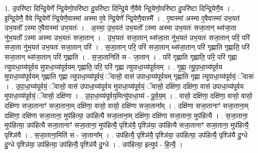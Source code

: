 \documentclass[17pt]{extarticle}
\begin{document}
1. उ॒परि॑ष्टा दिन्द्रि॒येणे᳚ न्द्रि॒येणो॒परि॑ष्टा दु॒परि॑ष्टा दिन्द्रि॒ये णै॒वैवे न्द्रि॒येणो॒परि॑ष्टा दु॒परि॑ष्टा दिन्द्रि॒येणै॒व । . इ॒न्द्रि॒येणै॒ वैवे न्द्रि॒येणे᳚ न्द्रि॒येणै॒वास्मा॑ अस्मा ए॒वे न्द्रि॒येणे᳚ न्द्रि॒येणै॒वास्मै᳚ । . ए॒वास्मा॑ अस्मा ए॒वैवास्मा॑ उभ॒यत॑ उभ॒यतो᳚ ऽस्मा ए॒वैवास्मा॑ उभ॒यतः॑ । . अ॒स्मा॒ उ॒भ॒यत॑ उभ॒यतो᳚ ऽस्मा अस्मा उभ॒यतः॑ सजा॒तान् थ्स॑जा॒ता नु॑भ॒यतो᳚ ऽस्मा अस्मा उभ॒यतः॑ सजा॒तान् । . उ॒भ॒यतः॑ सजा॒तान् थ्स॑जा॒ता नु॑भ॒यत॑ उभ॒यतः॑ सजा॒तान् परि॒ परि॑ सजा॒ता नु॑भ॒यत॑ उभ॒यतः॑ सजा॒तान् परि॑ । . स॒जा॒तान् परि॒ परि॑ सजा॒तान् थ्स॑जा॒तान् परि॑ गृह्णाति गृह्णाति॒ परि॑ सजा॒तान् थ्स॑जा॒तान् परि॑ गृह्णाति । . स॒जा॒तानिति॑ स - जा॒तान् । . परि॑ गृह्णाति गृह्णाति॒ परि॒ परि॑ गृह्णा त्युपाधा॒य्य॑पूर्वय मुपाधा॒य्य॑पूर्वयम् गृह्णाति॒ परि॒ परि॑ गृह्णा त्युपाधा॒य्य॑पूर्वयम् । . गृ॒ह्णा॒ त्यु॒पा॒धा॒य्य॑पूर्वय मुपाधा॒य्य॑पूर्वयम् गृह्णाति गृह्णा त्युपाधा॒य्य॑पूर्वयं॒ ॅवासो॒ वास॑ उपाधा॒य्य॑पूर्वयम् गृह्णाति गृह्णा त्युपाधा॒य्य॑पूर्वयं॒ ॅवासः॑ । . उ॒पा॒धा॒य्य॑पूर्वयं॒ ॅवासो॒ वास॑ उपाधा॒य्य॑पूर्वय मुपाधा॒य्य॑पूर्वयं॒ ॅवासो॒ दक्षि॑णा॒ दक्षि॑णा॒ वास॑ उपाधा॒य्य॑पूर्वय मुपाधा॒य्य॑पूर्वयं॒ ॅवासो॒ दक्षि॑णा । . उ॒पा॒धा॒य्य॑पूर्वय॒मित्यु॑पाधा॒य्य॑ - पू॒र्व॒य॒म् । . वासो॒ दक्षि॑णा॒ दक्षि॑णा॒ वासो॒ वासो॒ दक्षि॑णा सजा॒तानाꣳ॑ सजा॒ताना॒म् दक्षि॑णा॒ वासो॒ वासो॒ दक्षि॑णा सजा॒ताना᳚म् । . दक्षि॑णा सजा॒तानाꣳ॑ सजा॒ताना॒म् दक्षि॑णा॒ दक्षि॑णा सजा॒ताना॒ मुप॑हित्या॒ उप॑हित्यै सजा॒ताना॒म् दक्षि॑णा॒ दक्षि॑णा सजा॒ताना॒ मुप॑हित्यै । . स॒जा॒ताना॒ मुप॑हित्या॒ उप॑हित्यै सजा॒तानाꣳ॑ सजा॒ताना॒ मुप॑हित्यै॒ पृश्ञि॑यै॒ पृश्ञि॑या॒ उप॑हित्यै सजा॒तानाꣳ॑ सजा॒ताना॒ मुप॑हित्यै॒ पृश्ञि॑यै । . स॒जा॒ताना॒मिति॑ स - जा॒ताना᳚म् । . उप॑हित्यै॒ पृश्ञि॑यै॒ पृश्ञि॑या॒ उप॑हित्या॒ उप॑हित्यै॒ पृश्ञि॑यै दु॒ग्धे दु॒ग्धे पृश्ञि॑या॒ उप॑हित्या॒ उप॑हित्यै॒ पृश्ञि॑यै दु॒ग्धे । . उप॑हित्या॒ इत्युप॑ - हि॒त्यै॒ । \newline
\end{document}
